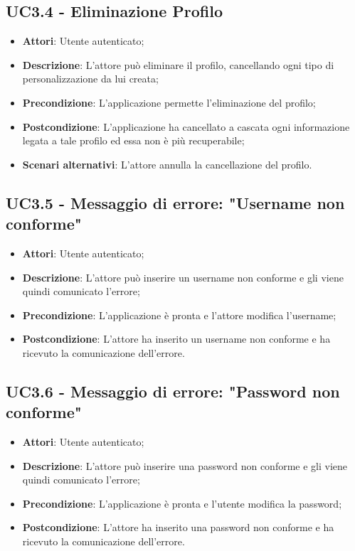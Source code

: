 \subsection{UC3.4 - Eliminazione Profilo} 
\label{ssec:UC3.4} 
\begin{itemize} 
\item \textbf{Attori}: Utente autenticato;
\item \textbf{Descrizione}: L'attore può eliminare il profilo, cancellando ogni tipo di personalizzazione da lui creata;
\item \textbf{Precondizione}: L'applicazione permette l'eliminazione del profilo;
\item \textbf{Postcondizione}: L'applicazione ha cancellato a cascata ogni informazione legata a tale profilo ed essa non è più recuperabile;
\item \textbf{Scenari alternativi}: L'attore annulla la cancellazione del profilo.
\end{itemize} 
\subsection{UC3.5 - Messaggio di errore: "Username non conforme"} 
\label{ssec:UC3.5} 
\begin{itemize} 
\item \textbf{Attori}: Utente autenticato;
\item \textbf{Descrizione}: L'attore può inserire un username non conforme e gli viene quindi comunicato l'errore;
\item \textbf{Precondizione}: L'applicazione è pronta e l'attore modifica l'username;
\item \textbf{Postcondizione}: L'attore ha inserito un username non conforme e ha ricevuto la comunicazione dell'errore.
\end{itemize} 
\subsection{UC3.6 - Messaggio di errore: "Password non conforme"} 
\label{ssec:UC3.6} 
\begin{itemize} 
\item \textbf{Attori}: Utente autenticato;
\item \textbf{Descrizione}: L'attore può inserire una password non conforme e gli viene quindi comunicato l'errore;
\item \textbf{Precondizione}: L'applicazione è pronta e l'utente modifica la password;
\item \textbf{Postcondizione}: L'attore ha inserito una password non conforme e ha ricevuto la comunicazione dell'errore.
\end{itemize} 
